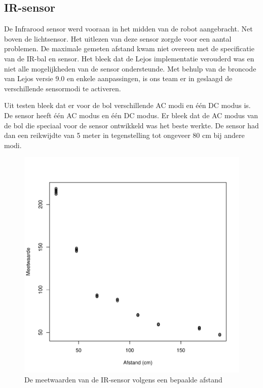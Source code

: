 \documentclass[12pt,a4paper]{report}
\begin{document}
\subsection{IR-sensor}
De Infrarood sensor werd vooraan in het midden van de robot aangebracht. Net boven de lichtsensor. Het uitlezen van deze sensor zorgde voor een aantal problemen. De maximale gemeten afstand kwam niet overeen met de specificatie van de IR-bal en sensor. Het bleek dat de Lejos implementatie verouderd was en niet alle mogelijkheden van de sensor ondersteunde. Met behulp van de broncode van Lejos versie 9.0 en enkele aanpassingen, is ons team er in geslaagd de verschillende sensormodi te activeren.

Uit testen bleek dat er voor de bol verschillende AC modi en \'e\'en DC modus is. De sensor heeft \'e\'en AC modus en \'e\'en DC modus. Er bleek dat de AC modus van de bol die speciaal voor de sensor ontwikkeld was het beste werkte. De sensor had dan een reikwijdte van 5 meter in tegenstelling tot ongeveer 80 cm bij andere modi.

\begin{figure}
\begin{center}
 \includegraphics[width=\textwidth]{./resources/plotIR.pdf}
 \caption{De meetwaarden van de IR-sensor volgens een bepaalde afstand \label{fig:plotIR}}
\end{center}
\end{figure}
\end{document}
